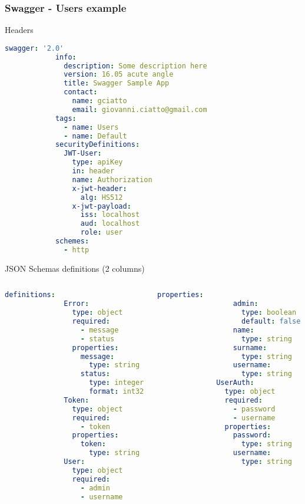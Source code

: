 \begin{frame}
	\frametitle{Swagger - Users example}
	\begin{exampleblock}{Headers}
		\begin{lstlisting}[language=yaml,basicstyle=\tiny,linewidth=0.48\textwidth] 
			swagger: '2.0'
			info:
			  description: Some description here
			  version: 16.05 acute angle
			  title: Swagger Sample App
			  contact: 
			    name: gciatto
			    email: giovanni.ciatto@gmail.com
			tags:
			  - name: Users
			  - name: Default  
			securityDefinitions:
			  JWT-User:
			    type: apiKey
			    in: header
			    name: Authorization
			    x-jwt-header:
			      alg: HS512
			    x-jwt-payload:
			      iss: localhost
			      aud: localhost
			      role: user
			schemes:
			  - http
		\end{lstlisting}
	\end{exampleblock}
	
	\begin{exampleblock}{JSON Schemas definitions (2 columns)}
		\begin{columns}
		\begin{column}{0.48\textwidth}
		\begin{lstlisting}[language=yaml,basicstyle=\tiny] 
			definitions:
			  Error:
			    type: object
			    required:
			      - message
			      - status
			    properties:
			      message:
			        type: string
			      status:
			        type: integer
			        format: int32
			  Token:
			    type: object
			    required:
			      - token
			    properties:
			      token:
			        type: string
			  User:
			    type: object
			    required:
			      - admin
			      - username
		\end{lstlisting}
		\end{column}
		\begin{column}{0.48\textwidth}	
		\begin{lstlisting}[language=yaml,basicstyle=\tiny] 
			    properties:
			      admin:
			        type: boolean
			        default: false
			      name:
			        type: string
			      surname:
			        type: string
			      username:
			        type: string
			  UserAuth:
			    type: object
			    required:
			      - password
			      - username
			    properties:
			      password:
			        type: string
			      username:
			        type: string
		\end{lstlisting}
		\end{column}
		\end{columns}
	\end{exampleblock}
	

\end{frame}
